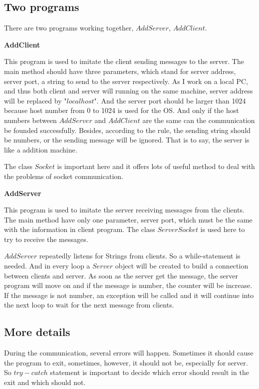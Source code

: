 \documentclass{article}
\begin{document}
\subsection{Two programs}
There are two programs working together, $AddServer$, $AddClient$.
\begin{compactitem}
\item \textbf{AddClient}

This program is used to imitate the client sending messages to the server. The main method should have three parameters, which stand for server address, server port, a string to send to the server respectively. As I work on a local PC, and thus both client and server will running on the same machine, server address will be replaced by "$localhost$". And the server port should be larger than 1024 because host number from 0 to 1024 is used for the OS. And only if the host numbers between $AddServer$ and $AddClient$ are the same can the communication be founded successfully. Besides, according to the rule, the sending string should be numbers, or the sending message will be ignored. That is to say, the server is like a addition machine.

The class $Socket$ is important here and it offers lots of useful method to deal with the problems of socket communication.

\item \textbf{AddServer}

This program is used to imitate the server receiving messages from the clients. The main method have only one parameter, server port, which must be the same with the information in client program. The class $ServerSocket$ is used here to try to receive the messages.

$AddServer$ repeatedly listens for Strings from clients. So a while-statement is needed. And in every loop a $Server$ object will be created to build a connection between clients and server. As soon as the server get the message, the server program will move on and if the message is number, the counter will be increase. If the message is not number, an exception will be called and it will continue into the next loop to wait for the next message from clients.

\end{compactitem}

\subsection{More details}
During the communication, several errors will happen. Sometimes it should cause the program to exit, sometimes, however, it should not be, especially for server. So $try-catch$ statement is important to decide which error should result in the exit and which should not.
\end{document}
